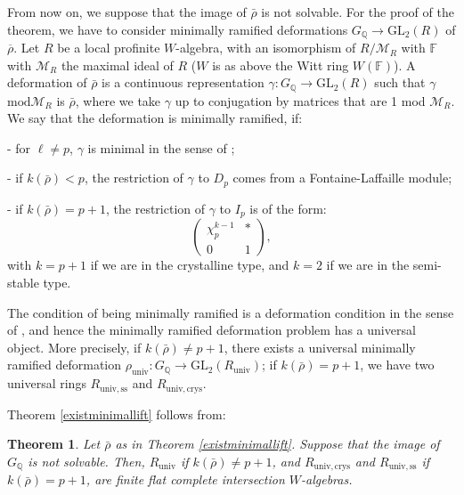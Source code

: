 \documentclass[12pt]{article}
\newcommand{\Q}{\mathbb{Q}}
\newcommand{\GL}{\mathrm{GL}}
\newtheorem{theorem}{Theorem}[section]
\def\rhob{ {\bar {\rho} } }
\newcommand{\F}{{\mathbb F}}
\begin{document}
From now on, we suppose that the image of $\rhob$ is not solvable.
For the proof of the theorem, we have to consider minimally
ramified deformations
$G_{\Q }\rightarrow \GL_ 2 (R)$ of $\overline{\rho }$.
Let $R$ be a local profinite $W$-algebra, with an isomorphism
of $R/\mathcal{M}_R$ with $\F$ with $\mathcal{M}_R$ the maximal ideal
of $R$ ($W$ is as above the Witt ring $W(\F )$).
A deformation of $\rhob$ is a continuous representation
$\gamma :G_{\Q}\rightarrow \GL_2 (R)$
such that $\gamma$ $\mathrm{mod} \mathcal{M}_R$
is ${\rhob}$, where we take $\gamma$ up to conjugation by matrices that
are 1 mod $\mathcal{M}_R$. We say that the deformation is
minimally ramified, if:


- for $\ell \not=p$, $\gamma$ is minimal in the sense of \cite{[D97]};

- if $k(\rhob )<p$, the restriction of $\gamma$ to $D_p$ comes
from a Fontaine-Laffaille module;

- if  $k(\rhob )=p+1$, the restriction of $\gamma$ to $I_p$
is of the form:
$$\left( \begin{array}{cc}
    \chi_p ^{k-1} & *  \\
    0 & 1
\end{array} \right),$$
with $k=p+1$ if we are in the crystalline type, and $k=2$ if we are
in the semi-stable type.

The condition of being minimally ramified is a deformation condition in
the sense of \cite{[M97]}, and hence the minimally ramified deformation
problem
has a universal object. More precisely,
if $k(\rhob) \not= p+1$, there exists a universal
minimally ramified deformation
$\rho_{\mathrm{univ}}: G_{\Q }\rightarrow \GL_2 (R_{\mathrm{univ}})$;
if $k(\rhob )=p+1$, we have two universal rings
$R_{\mathrm{univ,ss}}$ and $R_{\mathrm{univ,crys}}$.


Theorem \ref{existminimallift} follows from:
\begin{theorem}\label{completeinters} Let ${\rhob}$ as in Theorem
\ref{existminimallift}. Suppose that the image of
$G_{\Q }$ is not solvable. Then,  $R_{\mathrm{univ}}$ if
$k({\rhob} )\not= p+1$, and
$R_{\mathrm{univ,crys}}$ and $R_{\mathrm{univ,ss}}$ if
$k({\rhob} )= p+1$, are finite
flat complete intersection $W$-algebras. \end{theorem}
\end{document}
